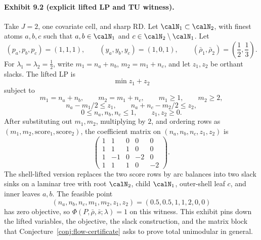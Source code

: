 \documentclass[11pt]{article}
\theoremstyle{definition}
\theoremstyle{plain}
\theoremstyle{remark}
\begin{document}
\paragraph{Exhibit 9.2 (explicit lifted LP and TU witness).}
Take \(J=2\), one covariate cell, and sharp RD.  Let \(\calN_1\subset\calN_2\), with finest
atoms \(a,b,c\) such that \(a,b\in\calN_1\) and \(c\in\calN_2\setminus\calN_1\).  Let
\[
  (p_a,p_b,p_c)=(1,1,1),\qquad (y_a,y_b,y_c)=(1,0,1),\qquad
  (\bar\rho_1,\bar\rho_2)=\left(\frac12,\frac13\right).
\]
For \(\lambda_1=\lambda_2=\frac12\), write \(m_1=n_a+n_b\), \(m_2=m_1+n_c\), and let
\(z_1,z_2\) be orthant slacks.  The lifted LP is
\[
  \min z_1+z_2
\]
subject to
\[
  m_1=n_a+n_b,\qquad m_2=m_1+n_c,\qquad m_1\ge 1,\qquad m_2\ge 2,
\]
\[
  n_a-m_1/2\le z_1,\qquad n_a+n_c-m_2/2\le z_2,
\]
\[
  0\le n_a,n_b,n_c\le 1,\qquad z_1,z_2\ge 0.
\]
After substituting out \(m_1,m_2\), multiplying by \(2\), and ordering rows as
\((m_1,m_2,\mathrm{score}_1,\mathrm{score}_2)\), the coefficient matrix on
\((n_a,n_b,n_c,z_1,z_2)\) is
\[
  \begin{pmatrix}
    1 & 1 & 0 & 0 & 0\\
    1 & 1 & 1 & 0 & 0\\
    1 & -1 & 0 & -2 & 0\\
    1 & 1 & 1 & 0 & -2
  \end{pmatrix}.
\]
The shell-lifted version replaces the two score rows by arc balances into two slack sinks on a
laminar tree with root \(\calN_2\), child \(\calN_1\), outer-shell leaf \(c\), and inner leaves
\(a,b\).  The feasible point
\[
  (n_a,n_b,n_c,m_1,m_2,z_1,z_2)=(0.5,0.5,1,1,2,0,0)
\]
has zero objective, so \(\Phi(P,\bar\rho,\bar s;\lambda)=1\) on this witness.  This exhibit pins
down the lifted variables, the objective, the slack construction, and the matrix block that
Conjecture~\ref{conj:flow-certificate} asks to prove total unimodular in general.
\end{document}
